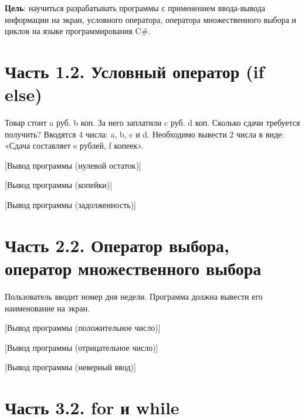 \documentclass{bsuir}
\newcommand{\csharp}{C{\liberationrm\#}}
\begin{document}


    \textbf{Цель}: научиться разрабатывать программы с применением ввода-вывода
    информации на экран, условного оператора, оператора множественного выбора и
    циклов на языке программирования \csharp.

    \section*{Часть 1.2. Условный оператор (if else)}

    Товар стоит a руб. b коп. За него заплатили c руб. d коп. Сколько сдачи
    требуется получить? Вводятся 4 числа: a, b, c и d. Необходимо вывести 2 числа в
    виде: «Сдача составляет e рублей, f копеек».


    [Вывод программы (нулевой остаток)]

    [Вывод программы (копейки)]

    [Вывод программы (задолженность)]

    \section*{Часть 2.2. Оператор выбора, оператор множественного выбора}

    Пользователь вводит номер дня недели. Программа должна вывести его наименование
    на экран.


    [Вывод программы (положительное число)]

    [Вывод программы (отрицательное число)]

    [Вывод программы (неверный ввод)]

    \section*{Часть 3.2. for и while}
\end{document}
